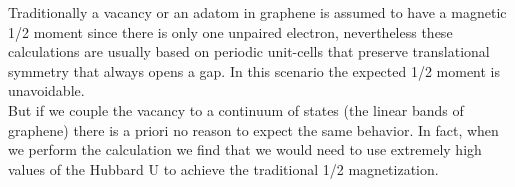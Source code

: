
Traditionally a vacancy or an adatom in graphene is assumed to have a magnetic 1/2 moment since there is only one unpaired electron, nevertheless these calculations are usually based on periodic unit-cells that preserve translational symmetry that always opens a gap. In this scenario the expected 1/2 moment is unavoidable.\\

But if we couple the vacancy to a continuum of states (the linear bands of graphene) there is a priori no reason to expect the same behavior. In fact, when we perform the calculation we find that we would need to use extremely high values of the Hubbard U to achieve the traditional 1/2 magnetization.

